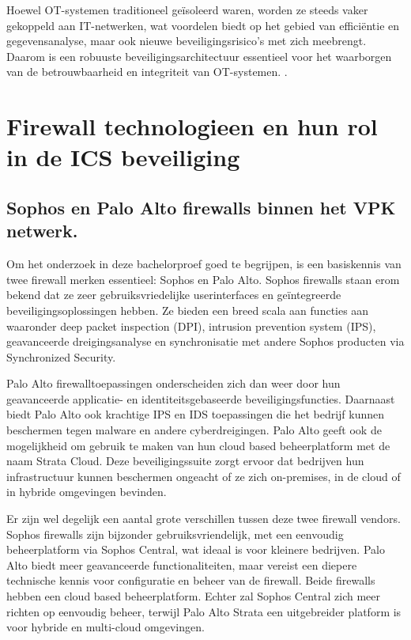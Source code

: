 Hoewel OT-systemen traditioneel geïsoleerd waren, worden ze steeds vaker gekoppeld aan IT-netwerken, wat voordelen biedt op het gebied van efficiëntie en gegevensanalyse, maar ook nieuwe beveiligingsrisico’s met zich meebrengt. Daarom is een robuuste beveiligingsarchitectuur essentieel voor het waarborgen van de betrouwbaarheid en integriteit van OT-systemen. \autocite{Stouffer2023}.

\section{Firewall technologieen en hun rol in de ICS beveiliging}

\subsection{Sophos en Palo Alto firewalls binnen het VPK netwerk.}
Om het onderzoek in deze bachelorproef goed te begrijpen, is een basiskennis van twee firewall merken essentieel: Sophos en Palo Alto. Sophos firewalls staan erom bekend dat ze zeer gebruiksvriedelijke userinterfaces en geïntegreerde beveiligingsoplossingen hebben. Ze bieden een breed scala aan functies aan waaronder deep packet inspection (DPI), intrusion prevention system (IPS), geavanceerde dreigingsanalyse en synchronisatie met andere Sophos producten via Synchronized Security. \autocite{Phipps2024}

Palo Alto firewalltoepassingen onderscheiden zich dan weer door hun geavanceerde applicatie- en identiteitsgebaseerde beveiligingsfuncties. Daarnaast biedt Palo Alto ook krachtige IPS en IDS toepassingen die het bedrijf kunnen beschermen tegen malware en andere cyberdreigingen. Palo Alto geeft ook de mogelijkheid om gebruik te maken van hun cloud based beheerplatform met de naam Strata Cloud. Deze beveiligingssuite zorgt ervoor dat bedrijven hun infrastructuur kunnen beschermen ongeacht of ze zich on-premises, in de cloud of in hybride omgevingen bevinden. \autocite{shread2023}

Er zijn wel degelijk een aantal grote verschillen tussen deze twee firewall vendors. Sophos firewalls zijn bijzonder gebruiksvriendelijk, met een eenvoudig beheerplatform via Sophos Central, wat ideaal is voor kleinere bedrijven. Palo Alto biedt meer geavanceerde functionaliteiten, maar vereist een diepere technische kennis voor configuratie en beheer van de firewall. Beide firewalls hebben een cloud based beheerplatform. Echter zal Sophos Central zich meer richten op eenvoudig beheer, terwijl Palo Alto Strata een uitgebreider platform is voor hybride en multi-cloud omgevingen. \autocite{paloGuard2025} 

